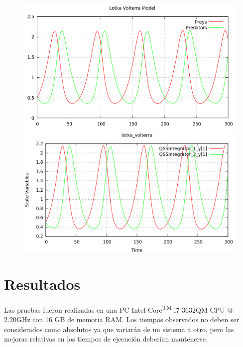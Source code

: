 \begin{figure}[H]
\centering
\begin{minipage}{0.5\textwidth}
\centering
 \includegraphics[width=\linewidth]{lotka_voltera-pd}
\end{minipage}\hfill
\begin{minipage}{0.5\textwidth}
\centering
 \includegraphics[width=\linewidth]{lotka_voltera-qss}
\end{minipage}
\end{figure}

\section{Resultados}

	Las pruebas fueron realizadas en una PC Intel\textsuperscript{\textregistered} Core\textsuperscript{TM} i7-3632QM CPU @ 2.20GHz con 16 GB de memoria RAM. Los tiempos observados no deben ser considerados 
	como absolutos ya que variarán de un sistema a otro, pero las mejoras relativas en los tiempos de ejecución deberían mantenerse.

